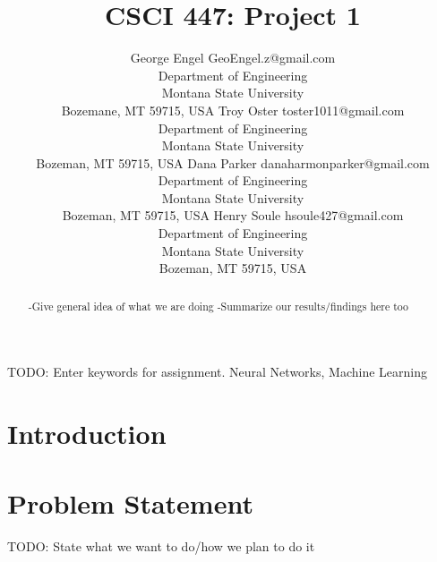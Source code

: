 \documentclass[twoside,11pt]{article}
\begin{document}
\title{CSCI 447: Project 1}

\author{\name George Engel \email GeoEngel.z@gmail.com \\
       \addr Department of Engineering\\
       Montana State University\\
       Bozemane, MT 59715, USA
       \AND
       \name Troy Oster \email toster1011@gmail.com \\
       \addr Department of Engineering\\
       Montana State University\\
       Bozeman, MT 59715, USA
       \AND
       \name Dana Parker \email danaharmonparker@gmail.com \\
       \addr Department of Engineering\\
       Montana State University\\
       Bozeman, MT 59715, USA
       \AND
       \name Henry Soule \email hsoule427@gmail.com \\
       \addr Department of Engineering\\
       Montana State University\\
       Bozeman, MT 59715, USA}


\maketitle

\begin{abstract}%

-Give general idea of what we are doing
-Summarize our results/findings here too

\end{abstract}

\begin{keywords}
    TODO: Enter keywords for assignment.
    Neural Networks, Machine Learning
%   
\end{keywords}

\section{Introduction}


\section{Problem Statement}
TODO: State what we want to do/how we plan to do it
\end{document}
